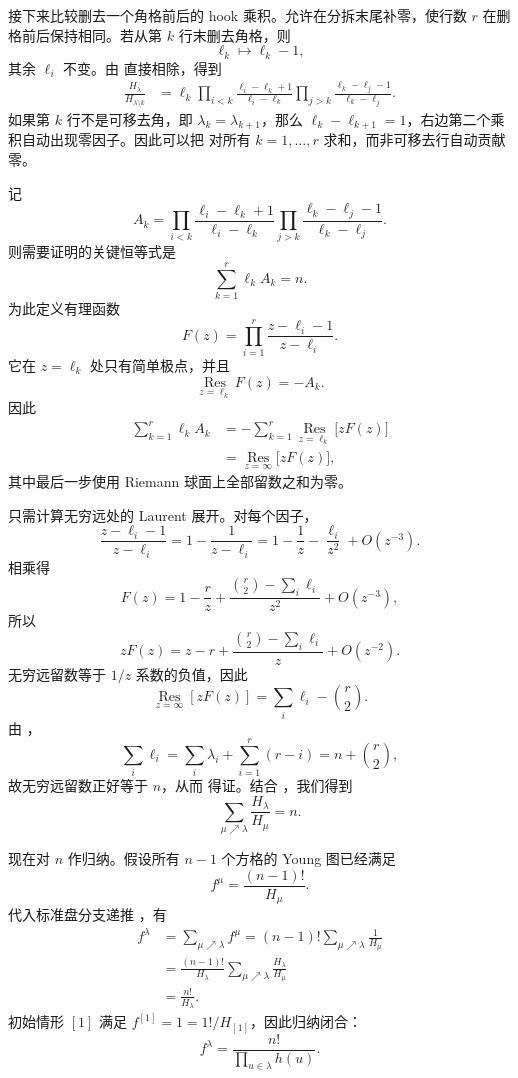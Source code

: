 接下来比较删去一个角格前后的 hook 乘积。允许在分拆末尾补零，使行数 $r$ 在删格前后保持相同。若从第 $k$ 行末删去角格，则
\[
\ell_k\longmapsto\ell_k-1,
\]
其余 $\ell_i$ 不变。由  直接相除，得到
\begin{align}
\frac{H_\lambda}{H_{\lambda\setminus k}}
&=\ell_k
\prod_{i<k}
\frac{\ell_i-\ell_k+1}{\ell_i-\ell_k}
\prod_{j>k}
\frac{\ell_k-\ell_j-1}{\ell_k-\ell_j}.
\label{eq:hook-corner-ratio}
\end{align}
如果第 $k$ 行不是可移去角，即 $\lambda_k=\lambda_{k+1}$，那么 $\ell_k-\ell_{k+1}=1$，右边第二个乘积自动出现零因子。因此可以把  对所有 $k=1,\dots,r$ 求和，而非可移去行自动贡献零。

记
\[
A_k=
\prod_{i<k}
\frac{\ell_i-\ell_k+1}{\ell_i-\ell_k}
\prod_{j>k}
\frac{\ell_k-\ell_j-1}{\ell_k-\ell_j}.
\]
则需要证明的关键恒等式是
\begin{equation}
\sum_{k=1}^{r}\ell_kA_k=n.
\label{eq:hook-ratio-sum}
\end{equation}
为此定义有理函数
\[
F(z)=\prod_{i=1}^{r}\frac{z-\ell_i-1}{z-\ell_i}.
\]
它在 $z=\ell_k$ 处只有简单极点，并且
\[
\operatorname*{Res}_{z=\ell_k}F(z)=-A_k.
\]
因此
\begin{align*}
\sum_{k=1}^{r}\ell_kA_k
&=-\sum_{k=1}^{r}\operatorname*{Res}_{z=\ell_k}\bigl[zF(z)\bigr]\\
&=\operatorname*{Res}_{z=\infty}\bigl[zF(z)\bigr],
\end{align*}
其中最后一步使用 Riemann 球面上全部留数之和为零。

只需计算无穷远处的 Laurent 展开。对每个因子，
\[
\frac{z-\ell_i-1}{z-\ell_i}
=1-\frac{1}{z-\ell_i}
=1-\frac1z-\frac{\ell_i}{z^2}+O(z^{-3}).
\]
相乘得
\[
F(z)
=1-\frac rz
+\frac{\binom r2-\sum_i\ell_i}{z^2}
+O(z^{-3}),
\]
所以
\[
zF(z)
=z-r+\frac{\binom r2-\sum_i\ell_i}{z}+O(z^{-2}).
\]
无穷远留数等于 $1/z$ 系数的负值，因此
\[
\operatorname*{Res}_{z=\infty}[zF(z)]
=\sum_i\ell_i-\binom r2.
\]
由 ，
\[
\sum_i\ell_i
=\sum_i\lambda_i+\sum_{i=1}^{r}(r-i)
=n+\binom r2,
\]
故无穷远留数正好等于 $n$，从而  得证。结合 ，我们得到
\begin{equation}
\sum_{\mu\nearrow\lambda}\frac{H_\lambda}{H_\mu}=n.
\label{eq:hook-product-recursion}
\end{equation}

现在对 $n$ 作归纳。假设所有 $n-1$ 个方格的 Young 图已经满足
\[
f^\mu=\frac{(n-1)!}{H_\mu}.
\]
代入标准盘分支递推 ，有
\begin{align*}
f^\lambda
&=\sum_{\mu\nearrow\lambda}f^\mu
=(n-1)!\sum_{\mu\nearrow\lambda}\frac1{H_\mu}\\
&=\frac{(n-1)!}{H_\lambda}
\sum_{\mu\nearrow\lambda}\frac{H_\lambda}{H_\mu}\\
&=\frac{n!}{H_\lambda}.
\end{align*}
初始情形 $[1]$ 满足 $f^{[1]}=1=1!/H_{[1]}$，因此归纳闭合：
\[
f^\lambda=\frac{n!}{\displaystyle\prod_{u\in\lambda}h(u)}.
\]

